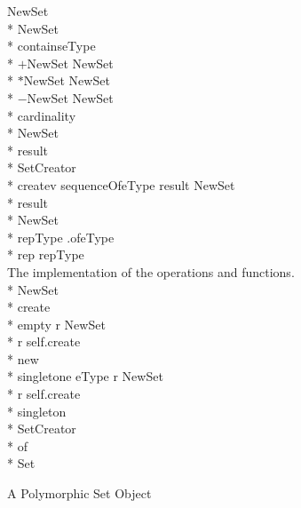 \begin{figure}[tbp]
\begin{center}
{\begin{minipage}{\textwidth}
\begin{tabbing}
      NewSet \assign{}\+\\*{}%
	  NewSet\+\\*{}%
	   contains\/\LB{}eType\/\RB{} \returns{} \/\LB{}\/\RB{}\\*{}%
	   $+$\/\LB{}NewSet\/\RB{} \returns{} \/\LB{}NewSet\/\RB{}\\*{}%
	   $*$\/\LB{}NewSet\/\RB{} \returns{} \/\LB{}NewSet\/\RB{}\\*{}%
	   $-$\/\LB{}NewSet\/\RB{} \returns{} \/\LB{}NewSet\/\RB{}\\*{}%
	   cardinality \returns{} \/\LB{}\/\RB{}\-\\*{}%
	 NewSet\-\-\\*{}%
    result \assign{} \+\\*{}%
       SetCreator\+\\*{}%
	  create\/\LB{}v \CO{} sequenceOfeType\/\RB{}\returns{} \/\LB{}result \CO{} NewSet\/\RB{}\+\\*{}%
	  result \assign{}\+\\*{}%
	     NewSet\+\\*{}%
	       repType \assign{} .of\/\LB{}eType\/\RB{}\\*{}%
	       rep \CO{} repType\\[1.0ex]{}%
	      \cd{} The implementation of the operations and functions.\-\-\\*{}%
	   NewSet\-\\*{}%
	 create\\*{}%
	  empty \returns{} \/\LB{}r \CO{} NewSet\/\RB{}\+\\*{}%
	  r \assign{} self.create\/\LB{}\/\RB{}\-\\*{}%
	 new\\*{}%
	  singleton\/\LB{}e \CO{} eType\/\RB{} \returns{} \/\LB{}r \CO{} NewSet\/\RB{}\+\\*{}%
	  r \assign{} self.create\/\/\RB{}\-\\*{}%
	 singleton\-\\*{}%
       SetCreator\-\-\\*{}%
   of\-\\*{}%
 Set
\end{tabbing}\end{minipage}}
\end{center}
\caption{A Polymorphic Set Object}
\label{polymorphicset}
\end{figure}
